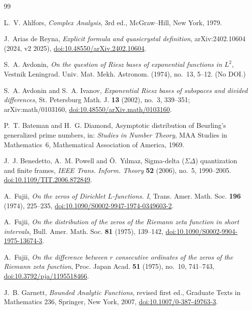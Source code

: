 \documentclass[11pt,reqno]{amsart}
\numberwithin{equation}{section}
\theoremstyle{plain}
\theoremstyle{definition}
\theoremstyle{remark}
\begin{document}
\begin{thebibliography}{99}

L.~V. Ahlfors, \emph{Complex Analysis}, 3rd ed., McGraw--Hill, New York, 1979.

J.~Arias de Reyna, \emph{Explicit formula and quasicrystal definition}, arXiv:2402.10604 (2024, v2 2025), \href{https://doi.org/10.48550/arXiv.2402.10604}{doi:10.48550/arXiv.2402.10604}.

S.~A. Avdonin, \emph{On the question of Riesz bases of exponential functions in $L^2$}, Vestnik Leningrad. Univ. Mat. Mekh. Astronom. (1974), no.~13, 5--12. (No DOI.)

S.~A. Avdonin and S.~A. Ivanov, \emph{Exponential Riesz bases of subspaces and divided differences}, St. Petersburg Math. J. \textbf{13} (2002), no.~3, 339--351; arXiv:math/0103160, \href{https://doi.org/10.48550/arXiv.math/0103160}{doi:10.48550/arXiv.math/0103160}.

P.~T. Bateman and H.~G. Diamond, Asymptotic distribution of Beurling's generalized prime numbers, in: \emph{Studies in Number Theory}, MAA Studies in Mathematics~6, Mathematical Association of America, 1969.

J.~J. Benedetto, A.~M. Powell and \"O.~Y{\i}lmaz, Sigma-delta ($\Sigma\Delta$) quantization and finite frames, \emph{IEEE Trans. Inform. Theory} \textbf{52} (2006), no.~5, 1990--2005.
\href{https://doi.org/10.1109/TIT.2006.872849}{doi:10.1109/TIT.2006.872849}.

A.~Fujii, \emph{On the zeros of Dirichlet $L$-functions. I}, Trans. Amer. Math. Soc. \textbf{196} (1974), 225--235, \href{https://doi.org/10.1090/S0002-9947-1974-0349603-2}{doi:10.1090/S0002-9947-1974-0349603-2}.

A.~Fujii, \emph{On the distribution of the zeros of the Riemann zeta function in short intervals}, Bull. Amer. Math. Soc. \textbf{81} (1975), 139--142, \href{https://doi.org/10.1090/S0002-9904-1975-13674-3}{doi:10.1090/S0002-9904-1975-13674-3}.

A.~Fujii, \emph{On the difference between $r$ consecutive ordinates of the zeros of the Riemann zeta function}, Proc. Japan Acad. \textbf{51} (1975), no.~10, 741--743, \href{https://doi.org/10.3792/pja/1195518466}{doi:10.3792/pja/1195518466}.

J.~B. Garnett, \emph{Bounded Analytic Functions}, revised first ed., Graduate Texts in Mathematics 236, Springer, New York, 2007, \href{https://doi.org/10.1007/0-387-49763-3}{doi:10.1007/0-387-49763-3}.


\end{thebibliography}
\end{document}
